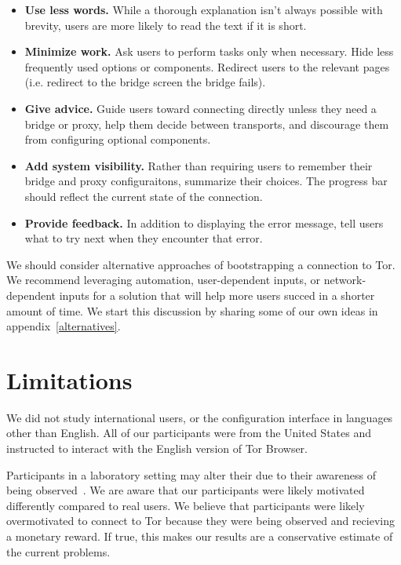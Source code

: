 \documentclass[USenglish,oneside,twocolumn]{article}
\begin{document}
\begin{itemize}
\item {\bfseries Use less words.} While a thorough explanation isn't always possible with brevity, users are more likely to read the text if it is short.
\item {\bfseries Minimize work.} Ask users to perform tasks only when necessary. Hide less frequently used options or components. Redirect users to the relevant pages (i.e. redirect to the bridge screen the bridge fails).  
\item {\bfseries Give advice.} Guide users toward connecting directly unless they need a bridge or proxy, help them decide between transports, and discourage them from configuring optional components. 
\item {\bfseries Add system visibility.} Rather than requiring users to remember their bridge and proxy configuraitons, summarize their choices. The progress bar should reflect the current state of the connection.
\item {\bfseries Provide feedback.} In addition to displaying the error message, tell users what to try next when they encounter that error. 
\end{itemize}

We should consider alternative approaches of bootstrapping a connection to Tor. We recommend leveraging automation, user-dependent inputs, or network-dependent inputs for a solution that will help more users succed in a shorter amount of time. We start this discussion by sharing some of our own ideas in appendix~\ref{alternatives}. 

\section{Limitations}
\label{sec:limitations}
We did not study international users, or the configuration interface in languages other than English. All of our participants were from the United States and instructed to interact with the English version of Tor Browser.

Participants in a laboratory setting may alter their due to their awareness of being observed~\cite{mccarney2007hawthorne}. We are aware that our participants were likely motivated differently compared to real users. We believe that participants were likely overmotivated to connect to Tor because they were being observed and recieving a monetary reward. If true, this makes our results are a conservative estimate of the current problems. 
\end{document}
